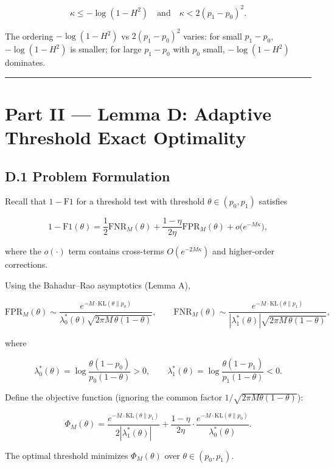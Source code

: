 \documentclass[
  12pt,
]{ctexart}
\begin{document}
\[
\kappa \leq -\log(1-H^2) \quad\text{and}\quad \kappa < 2(p_1-p_0)^2.
\]

The ordering \(-\log(1-H^2)\) vs \(2(p_1-p_0)^2\) varies: for small
\(p_1-p_0\), \(-\log(1-H^2)\) is smaller; for large \(p_1-p_0\) with
\(p_0\) small, \(-\log(1-H^2)\) dominates.

\begin{center}\rule{0.5\linewidth}{0.5pt}\end{center}

\section{Part II --- Lemma D: Adaptive Threshold Exact
Optimality}\label{part-ii-lemma-d-adaptive-threshold-exact-optimality}

\subsection{D.1 Problem Formulation}\label{d.1-problem-formulation}

Recall that \(1 - \text{F1}\) for a threshold test with threshold
\(\theta \in (p_0, p_1)\) satisfies

\[
1 - \text{F1}(\theta) = \frac{1}{2}\text{FNR}_M(\theta) + \frac{1-\eta}{2\eta}\text{FPR}_M(\theta) + o\bigl(e^{-M\kappa}\bigr),
\]

where the \(o(\cdot)\) term contains cross-terms \(O(e^{-2M\kappa})\)
and higher-order corrections.

Using the Bahadur--Rao asymptotics (Lemma A),

\[
\text{FPR}_M(\theta) \sim \frac{e^{-M\cdot\text{KL}(\theta\|p_0)}}{\lambda_0^*(\theta)\sqrt{2\pi M\,\theta(1-\theta)}},
\qquad
\text{FNR}_M(\theta) \sim \frac{e^{-M\cdot\text{KL}(\theta\|p_1)}}{|\lambda_1^*(\theta)|\sqrt{2\pi M\,\theta(1-\theta)}},
\]

where

\[
\lambda_0^*(\theta) = \log\frac{\theta(1-p_0)}{p_0(1-\theta)} > 0,\qquad
\lambda_1^*(\theta) = \log\frac{\theta(1-p_1)}{p_1(1-\theta)} < 0.
\]

Define the objective function (ignoring the common factor
\(1/\sqrt{2\pi M\theta(1-\theta)}\)):

\[
\Phi_M(\theta) = \frac{e^{-M\cdot\text{KL}(\theta\|p_1)}}{2|\lambda_1^*(\theta)|} + \frac{1-\eta}{2\eta}\cdot\frac{e^{-M\cdot\text{KL}(\theta\|p_0)}}{\lambda_0^*(\theta)}. \tag{D.1}
\]

The optimal threshold minimizes \(\Phi_M(\theta)\) over
\(\theta \in (p_0, p_1)\).
\end{document}
